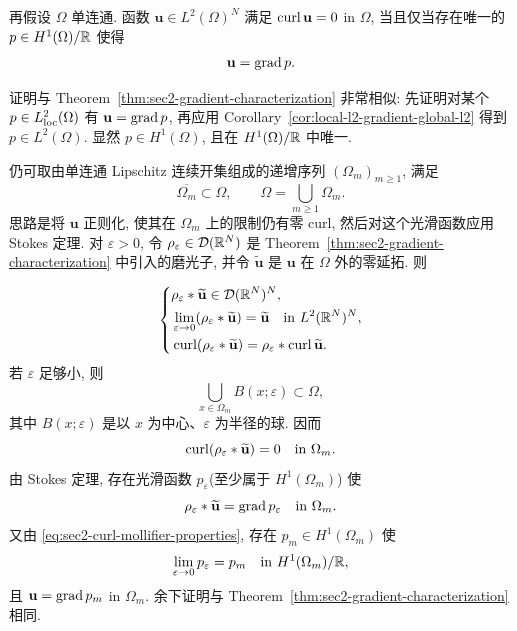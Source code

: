 \setcounter{statement}{8}
\begin{Theorem}\label{thm:sec2-curl-free-gradient}
再假设 $\Omega$ 单连通. 函数 $\mathbf u\in L^2(\Omega)^N$ 满足
$\operatorname{curl}\mathbf u=0$ in $\Omega$, 当且仅当存在唯一的
$p\in H^1(\Omega)/\mathbb{R}$ 使得
\[
  \mathbf u=\operatorname{grad} p.
\]
\end{Theorem}
\begin{Proof}
证明与 Theorem~\ref{thm:sec2-gradient-characterization} 非常相似: 先证明对某个
$p\in L_{\mathrm{loc}}^2(\Omega)$ 有 $\mathbf u=\operatorname{grad} p$, 再应用
Corollary~\ref{cor:local-l2-gradient-global-l2} 得到
$p\in L^2(\Omega)$. 显然 $p\in H^1(\Omega)$, 且在 $H^1(\Omega)/\mathbb{R}$ 中唯一.

仍可取由单连通 Lipschitz 连续开集组成的递增序列 $(\Omega_m)_{m\ge1}$, 满足
\[
  \overline{\Omega_m}\subset\Omega,
  \qquad\Omega=\bigcup_{m\ge1}\Omega_m.
\]
思路是将 $\mathbf u$ 正则化, 使其在 $\Omega_m$ 上的限制仍有零 curl, 然后对这个光滑函数应用 Stokes 定理.
对 $\varepsilon>0$, 令 $\rho_\varepsilon\in\mathcal{D}(\mathbb{R}^N)$ 是
Theorem~\ref{thm:sec2-gradient-characterization} 中引入的磨光子, 并令
$\widetilde{\mathbf u}$ 是 $\mathbf u$ 在 $\Omega$ 外的零延拓. 则

\begin{equation}\label{eq:sec2-curl-mollifier-properties}
\left\{\begin{aligned}
  &\rho_\varepsilon*\widetilde{\mathbf u}\in\mathcal{D}(\mathbb{R}^N)^N,\\
  &\lim_{\varepsilon\to0}(\rho_\varepsilon*\widetilde{\mathbf u})
    =\widetilde{\mathbf u}\quad\text{in }L^2(\mathbb{R}^N)^N,\\
  &\operatorname{curl}(\rho_\varepsilon*\widetilde{\mathbf u})
    =\rho_\varepsilon*\operatorname{curl}\widetilde{\mathbf u}.
\end{aligned}\right.
\end{equation}
若 $\varepsilon$ 足够小, 则
\[
  \bigcup_{x\in\Omega_m}B(x;\varepsilon)\subset\Omega,
\]
其中 $B(x;\varepsilon)$ 是以 $x$ 为中心、$\varepsilon$ 为半径的球. 因而
\[
  \operatorname{curl}(\rho_\varepsilon*\widetilde{\mathbf u})=0
  \quad\text{in }\Omega_m.
\]
由 Stokes 定理, 存在光滑函数 $p_\varepsilon$(至少属于 $H^1(\Omega_m)$) 使
\[
  \rho_\varepsilon*\widetilde{\mathbf u}=\operatorname{grad} p_\varepsilon
  \quad\text{in }\Omega_m.
\]
又由 \eqref{eq:sec2-curl-mollifier-properties}, 存在 $p_m\in H^1(\Omega_m)$ 使
\[
  \lim_{\varepsilon\to0}p_\varepsilon=p_m
  \quad\text{in }H^1(\Omega_m)/\mathbb{R},
\]
且 $\mathbf u=\operatorname{grad} p_m$ in $\Omega_m$. 余下证明与
Theorem~\ref{thm:sec2-gradient-characterization} 相同.
\end{Proof}

